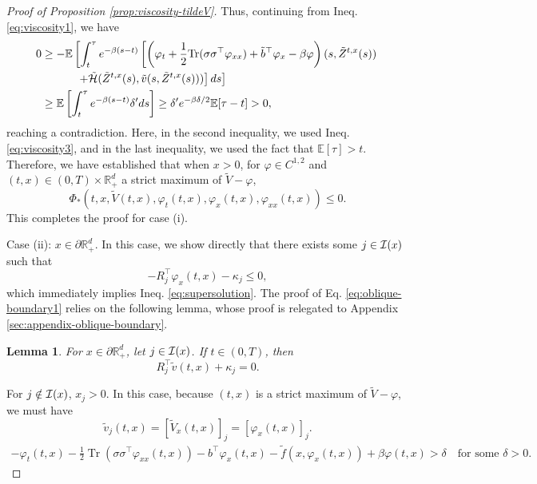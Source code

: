 \documentclass[11pt]{article}
\theoremstyle{definition}
\theoremstyle{plain}
\newtheorem{lemma}[assumption]{Lemma}
\newcommand{\R}{\mathbb{R}}
\newcommand{\E}{\mathbb{E}}
\newcommand{\cH}{{\cal H}}
\newcommand{\cI}{{\cal I}}
\newcommand{\tb}{\tilde{b}}
\begin{document}
\begin{proof}[Proof of Proposition \ref{prop:viscosity-tildeV}]
Thus, continuing from Ineq. \eqref{eq:viscosity1}, we have
\begin{align*}
0 &\ge -\mathbb{E} \left[ \int_t^{\tau} e^{-\beta(s - t)} \left[\left( \varphi_t + \frac{1}{2} \mathrm{Tr}(\sigma \sigma^{\top} \varphi_{xx}) + \tb^{\top} \varphi_x - \beta \varphi \right)(s, \tilde{Z}^{t,x}(s))\right.\right.  \\
& \qquad \quad \left.\left. + \tilde \cH (\tilde{Z}^{t,x}(s), \tilde{v}(s, \tilde Z^{t,x}(s))) \right] ds\right]  \\
& \ge \E \left[\int_t^\tau e^{-\beta(s-t)} \delta' ds\right] \ge \delta' e^{-\beta \delta/2} \E[\tau-t] > 0, 
\end{align*}
reaching a contradiction. Here, in the second inequality, we used Ineq. \eqref{eq:viscosity3}, 
and in the last inequality, we used the fact that $\E[\tau] > t$. 
Therefore, we have established that when $x > 0$, for $\varphi \in C^{1,2}$ and $(t,x) \in (0,T) \times \mathbb{R}_+^d$ a strict maximum of $\tilde V - \varphi$,
\begin{equation}
\Phi_*(t,x,\tilde V(t,x), \varphi_t(t,x), \varphi_x(t,x), \varphi_{xx}(t,x)) \leq 0.
\end{equation}
This completes the proof for case (i). 

Case (ii): $x \in \partial \R_+^d$. In this case, we show directly that there exists some $j \in \cI(x)$ such that 
\begin{equation}\label{eq:oblique-boundary1}
-R_j^{\top} \varphi_x(t,x) - \kappa_j \leq 0,
\end{equation}
which immediately implies Ineq. \eqref{eq:supersolution}. The proof of Eq. \eqref{eq:oblique-boundary1} relies on the following lemma, 
whose proof is relegated to Appendix \ref{sec:appendix-oblique-boundary}.
\begin{lemma}\label{lem:oblique-boundary}
For $x\in \partial \R_+^d$, let $j \in \cI(x)$. If $t \in (0,T)$, then
\begin{equation}\label{eq:oblique-boundary2}
R_j^{\top} \tilde{v}(t,x) + \kappa_j = 0.
\end{equation}
\end{lemma}
For $j \notin \cI(x)$, $x_j > 0$. In this case, because $(t,x)$ is a strict maximum of $\tilde V - \varphi$, 
we must have
\begin{equation}
\tilde v_j (t,x) = \left[\tilde V_x (t,x)\right]_j = \left[\varphi_x (t,x)\right]_j.
\end{equation}
\iffalse
{}
\begin{align}
- \varphi_t(t,x) - \tfrac{1}{2} \operatorname{Tr}(\sigma \sigma^{\top} \varphi_{xx}(t,x)) - b^{\top} \varphi_x(t,x) - \tilde{f}(x, \varphi_x(t,x)) + \beta \varphi(t,x) > \delta
\quad \text{for some } \delta > 0.
\end{align}


\end{proof}
\end{document}
